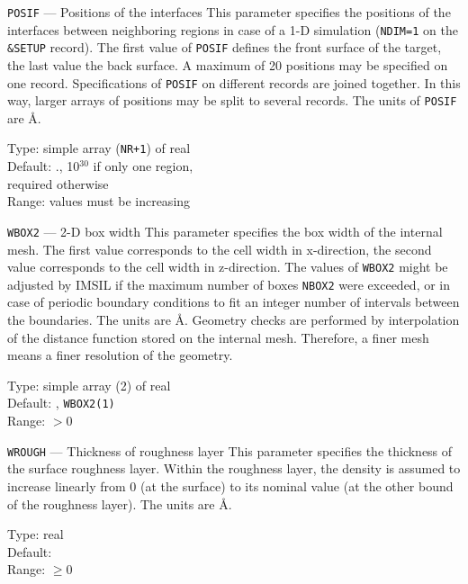 \begin{keydescription}{\texttt{POSIF} --- Positions of the interfaces}
%
  This parameter specifies the positions of the interfaces between
  neighboring regions in case of a 1-D simulation (\texttt{NDIM=1} on
  the \texttt{\&SETUP} record). The first value of \texttt{POSIF}
  defines the front surface of the target, the last value the back
  surface.  A maximum of 20 positions may be specified on one record.
  Specifications of \texttt{POSIF} on different records are joined together.  In
  this way, larger arrays of positions may be split to several records.  The
  units of \texttt{POSIF} are \AA. 
  \begin{keytab}
    Type:    \> simple array (\texttt{NR+1}) of real \\
    Default: ., 10$^{30}$ if only one region, \\
             \> required otherwise \\
    Range:   \> values must be increasing
  \end{keytab}
\end{keydescription}

\begin{keydescription}{\texttt{WBOX2} --- 2-D box width}
%
  This parameter specifies the box width of the internal mesh. The first 
  value corresponds to the cell width in x-direction, the second value 
  corresponds to the cell width in z-direction. The values of 
  \texttt{WBOX2} might be adjusted by IMSIL if the maximum number of boxes
  \texttt{NBOX2} were exceeded, or in case of periodic boundary conditions
  to fit an integer number of intervals between the boundaries. The units 
  are \AA.  Geometry checks are performed by interpolation of the distance
  function stored on the internal mesh. Therefore, a finer mesh means a finer
  resolution of the geometry.
  \begin{keytab}
    Type:    \> simple array (2) of real \\
    Default: , \texttt{WBOX2(1)} \\
    Range:   \> $> 0$
  \end{keytab}
\end{keydescription}

\begin{keydescription}{\texttt{WROUGH} --- Thickness of roughness layer}
%
  This parameter specifies the thickness of the surface roughness layer.
  Within the roughness layer, the density is assumed to increase linearly
  from 0 (at the surface) to its nominal value (at the other bound of the
  roughness layer). The units are \AA. 
  \begin{keytab}
    Type:    \> real \\
    Default:  \\
    Range:   \> $\ge 0$
  \end{keytab}
\end{keydescription}


